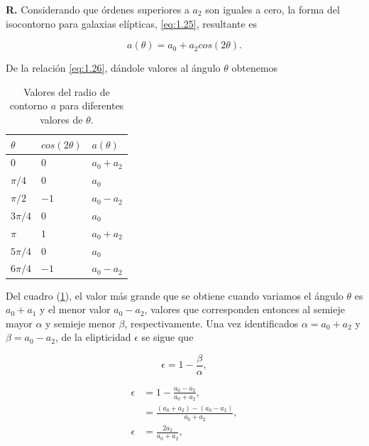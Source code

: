 \documentclass[paper=a4, fontsize=10pt]{scrartcl} %
\begin{document}
\vspace{0.3cm} 

{\bf{R.}} Considerando que órdenes superiores a $a_2$ son iguales a cero, la forma del isocontorno para galaxias elípticas, \eqref{eq:1.25}, resultante es

\begin{equation} \label{eq:1.26} 
a(\theta) = a_0 + a_2cos(2\theta).
\end{equation}

De la relación \eqref{eq:1.26}, dándole valores al ángulo $\theta$ obtenemos 

\begin{table}[htbp]
\begin{center}
\begin{tabular}{|l|l|l|}
\hline
$\theta$ & $cos(2\theta)$ & $a(\theta)$ \\ \hline 
$0$ & $0$ & $a_0 + a_2$ \\ \hline
$\pi/4$ & $0$ & $ a_0$ \\ \hline
$\pi/2$ & $-1$ & $ a_0 - a_2$ \\ \hline
$3\pi/4$ & $0$ & $ a_0$ \\ \hline
$\pi$ & $1$ & $a_0 + a_2$ \\ \hline
$5\pi/4$ & $0$ & $a_0$ \\ \hline
$6\pi/4$ & $-1$ & $ a_0 - a_2$ \\ \hline
\end{tabular}
\caption{\small{Valores del radio de contorno $a$ para diferentes valores de $\theta$.}}
\label{tabla:1}
\end{center}
\end{table}

Del cuadro (\ref{tabla:1}), el valor más grande que se obtiene cuando variamos el ángulo $\theta$ es $a_0 + a_1$ y el menor valor $a_0 - a_2$, valores que corresponden entonces al semieje mayor $\alpha$ y semieje menor $\beta$, respectivamente. Una vez identificados $\alpha = a_0 + a_2$ y $\beta = a_0 - a_2$, de la elipticidad $\epsilon$ se sigue que 

\begin{equation} \label{eq:1.27}
\epsilon = 1 - \frac{\beta}{\alpha}, 
\end{equation}

\begin{align*}
\epsilon & = 1 - \frac{a_0 - a_2}{a_0+a_2}, \\
& = \frac{(a_0+a_2) - (a_0-a_2)}{a_0+a_2}, \\
\epsilon & = \frac{2a_2}{a_0 + a_2},
\end{align*}
\end{document}
